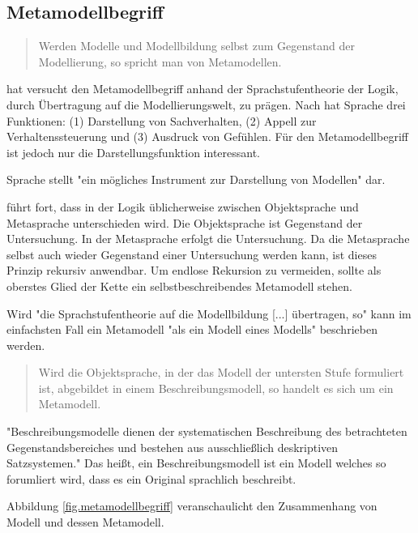 \subsection{Metamodellbegriff}\label{sec.metamodellbegriff}

\begin{quote}
Werden Modelle und Modellbildung selbst zum Gegenstand der Modellierung, so spricht man von Metamodellen. \citep{stra}
\end{quote}

\citep{stra} hat versucht den Metamodellbegriff anhand der Sprachstufentheorie der Logik,
durch Übertragung auf die Modellierungswelt, zu prägen.
Nach \citep{buehler} hat Sprache drei Funktionen:
(1) Darstellung von Sachverhalten, (2) Appell zur Verhaltenssteuerung und
(3) Ausdruck von Gefühlen.
Für den Metamodellbegriff ist jedoch nur die Darstellungsfunktion
interessant.

Sprache stellt "ein mögliches Instrument zur Darstellung von Modellen" dar.

\citep{stra} führt fort, dass in der Logik üblicherweise zwischen Objektsprache und Metasprache
unterschieden wird.
Die Objektsprache ist Gegenstand der Untersuchung.
In der Metasprache erfolgt die Untersuchung.
Da die Metasprache selbst auch wieder Gegenstand einer Untersuchung werden kann,
ist dieses Prinzip rekursiv anwendbar.
Um endlose Rekursion zu vermeiden, sollte als oberstes Glied der Kette ein selbstbeschreibendes
Metamodell stehen.

Wird "die Sprachstufentheorie auf die Modellbildung [...] übertragen, so" kann
im einfachsten Fall ein Metamodell "als ein Modell eines Modells" beschrieben werden.

\begin{quote}
Wird die Objektsprache, in der das Modell der untersten Stufe formuliert ist, abgebildet in einem Beschreibungsmodell, so handelt es sich um ein Metamodell.\citep[S.~3]{stra}
\end{quote}

"Beschreibungsmodelle dienen der systematischen Beschreibung des betrachteten Gegenstandsbereiches und bestehen aus ausschließlich deskriptiven Satzsystemen."
Das heißt, ein Beschreibungsmodell ist ein Modell welches so forumliert wird, dass es
ein Original sprachlich beschreibt.

Abbildung \ref{fig.metamodellbegriff} veranschaulicht den Zusammenhang von
Modell und dessen Metamodell.



